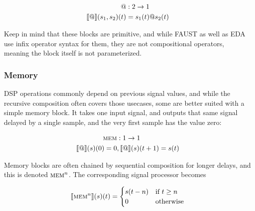\begin{minipage}{0.5\linewidth}
  \begin{align*}
    @                     & : 2 \rightarrow 1 \\
    \llbracket @ \rrbracket(s_1, s_2)(t) & = s_1(t) @ s_2(t) \\
  \end{align*}
\end{minipage}
\begin{minipage}{0.5\linewidth}
  \begin{figure}[H]
    \centering
    \label{fig:block_merge}
    
  \end{figure}
\end{minipage}

Keep in mind that these blocks are primitive, and while FAUST as well as EDA use infix operator syntax for
them, they are not compositional operators, meaning the block itself is not parameterized.

\subsubsection{Memory}

DSP operations commonly depend on previous signal values, and while the recursive composition often covers
those usecases, some are better suited with a simple memory block. It takes one input signal, and outputs
that same signal delayed by a single sample, and the very first sample has the value zero:

\begin{minipage}{0.5\linewidth}
  \begin{align*}
    \textsc{mem}               & : 1 \rightarrow 1           \\
    \llbracket @ \rrbracket(s)(0) = 0 & , \llbracket @ \rrbracket(s)(t + 1) = s(t) \\
  \end{align*}
\end{minipage}
\begin{minipage}{0.5\linewidth}
  \begin{figure}[H]
    \centering
    \label{fig:block_merge}
    
  \end{figure}
\end{minipage}

Memory blocks are often chained by sequential composition for longer delays, and this is denoted
$\textsc{mem}^n$. The corresponding signal processor becomes

\[
  \llbracket \textsc{mem}^n \rrbracket(s)(t) =
  \begin{cases}
    s(t - n) & \text{if } t \geq n \\
    0        & \text{otherwise}
  \end{cases}
\]

